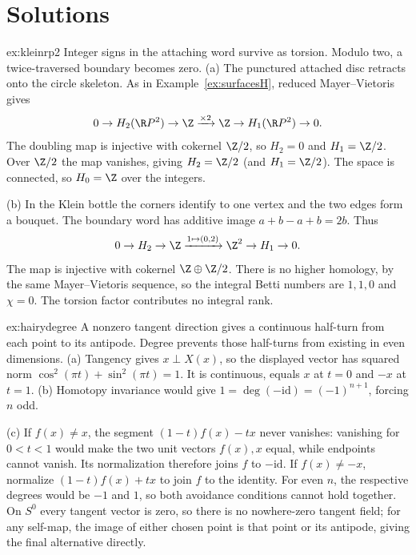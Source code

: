 \section{Solutions}

\begin{solution}{ex:kleinrp2}
\idea Integer signs in the attaching word survive as torsion. Modulo two, a twice-traversed boundary becomes zero.
\writeup (a) The punctured attached disc retracts onto the circle skeleton. As in Example~\ref{ex:surfacesH}, reduced Mayer--Vietoris gives
\[
0\to H_2(\R P^2)\to\Z\xrightarrow{\times2}\Z\to H_1(\R P^2)\to0.
\]
The doubling map is injective with cokernel $\Z/2$, so $H_2=0$ and $H_1=\Z/2$. Over $\Z/2$ the map vanishes, giving $H_2=\Z/2$ (and $H_1=\Z/2$). The space is connected, so $H_0=\Z$ over the integers.

(b) In the Klein bottle the corners identify to one vertex and the two edges form a bouquet. The boundary word has additive image $a+b-a+b=2b$. Thus
\[
0\to H_2\to\Z\xrightarrow{1\mapsto(0,2)}\Z^2\to H_1\to0.
\]
The map is injective with cokernel $\Z\oplus\Z/2$. There is no higher homology, by the same Mayer--Vietoris sequence, so the integral Betti numbers are $1,1,0$ and $\chi=0$. The torsion factor contributes no integral rank.
\end{solution}

\begin{solution}{ex:hairydegree}
\idea A nonzero tangent direction gives a continuous half-turn from each point to its antipode. Degree prevents those half-turns from existing in even dimensions.
\writeup (a) Tangency gives $x\perp X(x)$, so the displayed vector has squared norm $\cos^2(\pi t)+\sin^2(\pi t)=1$. It is continuous, equals $x$ at $t=0$ and $-x$ at $t=1$. (b) Homotopy invariance would give $1=\deg(-\mathrm{id})=(-1)^{n+1}$, forcing $n$ odd.

(c) If $f(x)\ne x$, the segment $(1-t)f(x)-tx$ never vanishes: vanishing for $0<t<1$ would make the two unit vectors $f(x),x$ equal, while endpoints cannot vanish. Its normalization therefore joins $f$ to $-\mathrm{id}$. If $f(x)\ne-x$, normalize $(1-t)f(x)+tx$ to join $f$ to the identity. For even $n$, the respective degrees would be $-1$ and $1$, so both avoidance conditions cannot hold together. On $S^0$ every tangent vector is zero, so there is no nowhere-zero tangent field; for any self-map, the image of either chosen point is that point or its antipode, giving the final alternative directly.
\end{solution}

